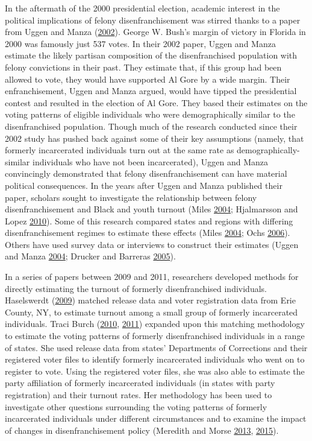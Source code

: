 \documentclass[]{article}
\begin{document}
In the aftermath of the 2000 presidential election, academic interest in the political implications of felony disenfranchisement was stirred thanks to a paper from Uggen and Manza (\protect\hyperlink{ref-Uggen2002}{2002}). George W. Bush's margin of victory in Florida in 2000 was famously just 537 votes. In their 2002 paper, Uggen and Manza estimate the likely partisan composition of the disenfranchised population with felony convictions in their past. They estimate that, if this group had been allowed to vote, they would have supported Al Gore by a wide margin. Their enfranchisement, Uggen and Manza argued, would have tipped the presidential contest and resulted in the election of Al Gore. They based their estimates on the voting patterns of eligible individuals who were demographically similar to the disenfranchised population. Though much of the research conducted since their 2002 study has pushed back against some of their key assumptions (namely, that formerly incarcerated individuals turn out at the same rate as demographically-similar individuals who have not been incarcerated), Uggen and Manza convincingly demonstrated that felony disenfranchisement can have material political consequences. In the years after Uggen and Manza published their paper, scholars sought to investigate the relationship between felony disenfranchisement and Black and youth turnout (Miles \protect\hyperlink{ref-Miles2004}{2004}; Hjalmarsson and Lopez \protect\hyperlink{ref-Hjalmarsson2010}{2010}). Some of this research compared states and regions with differing disenfranchisement regimes to estimate these effects (Miles \protect\hyperlink{ref-Miles2004}{2004}; Ochs \protect\hyperlink{ref-Ochs2006}{2006}). Others have used survey data or interviews to construct their estimates (Uggen and Manza \protect\hyperlink{ref-Uggen2004}{2004}; Drucker and Barreras \protect\hyperlink{ref-Drucker2005}{2005}).

In a series of papers between 2009 and 2011, researchers developed methods for directly estimating the turnout of formerly disenfranchised individuals. Haselswerdt (\protect\hyperlink{ref-Haselswerdt2009}{2009}) matched release data and voter registration data from Erie County, NY, to estimate turnout among a small group of formerly incarcerated individuals. Traci Burch (\protect\hyperlink{ref-Burch2010}{2010}, \protect\hyperlink{ref-Burch2011}{2011}) expanded upon this matching methodology to estimate the voting patterns of formerly disenfranchised individuals in a range of states. She used release data from states' Departments of Corrections and their registered voter files to identify formerly incarcerated individuals who went on to register to vote. Using the registered voter files, she was also able to estimate the party affiliation of formerly incarcerated individuals (in states with party registration) and their turnout rates. Her methodology has been used to investigate other questions surrounding the voting patterns of formerly incarcerated individuals under different circumstances and to examine the impact of changes in disenfranchisement policy (Meredith and Morse \protect\hyperlink{ref-Meredith2013}{2013}, \protect\hyperlink{ref-Meredith2015}{2015}).
\end{document}
